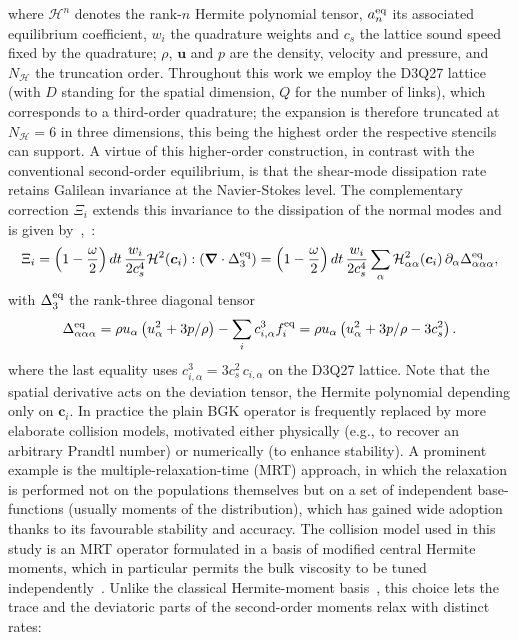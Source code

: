 where $\mathcal{H}^n$ denotes the rank-$n$ Hermite polynomial tensor, $a_n^{\rm eq}$ its associated equilibrium coefficient, $w_i$ the quadrature weights and $c_s$ the lattice sound speed fixed by the quadrature; $\rho$, $\bm{u}$ and $p$ are the density, velocity and pressure, and $N_\mathcal{H}$ the truncation order. Throughout this work we employ the D3Q27 lattice (with $D$ standing for the spatial dimension, $Q$ for the number of links), which corresponds to a third-order quadrature; the expansion is therefore truncated at $N_\mathcal{H}=6$ in three dimensions, this being the highest order the respective stencils can support. A virtue of this higher-order construction, in contrast with the conventional second-order equilibrium, is that the shear-mode dissipation rate retains Galilean invariance at the Navier-Stokes level. The complementary correction $\Xi_i$ extends this invariance to the dissipation of the normal modes and is given by~\cite{hosseini2020compressibility,feng2015three},~\cite{hosseini2022consistent,hosseini2024combustion}:
\begin{equation}\label{eq:correction}
    \Xi_i = \left(1-\frac{\omega}{2}\right)dt\,\frac{w_i}{2c_s^4}\mathcal{H}^2(\bm{c}_i):\left(\bm{\nabla}\cdot\Delta^{\rm eq}_3\right)
    = \left(1-\frac{\omega}{2}\right)dt\,\frac{w_i}{2c_s^4}\sum_{\alpha}\mathcal{H}^2_{\alpha\alpha}(\bm{c}_i)\,\partial_\alpha\Delta^{\rm eq}_{\alpha\alpha\alpha},
\end{equation}
with $\Delta^{\rm eq}_3$ the rank-three diagonal tensor
\begin{equation}
    \Delta^{\rm eq}_{\alpha\alpha\alpha} = \rho u_\alpha \left(u_\alpha^2 + 3p/\rho\right) - \sum_i c_{i,\alpha}^3 f^{\rm eq}_i = \rho u_\alpha \left(u_\alpha^2 + 3p/\rho - 3c_s^2\right).
\end{equation}
where the last equality uses $c_{i,\alpha}^3 = 3c_s^2\,c_{i,\alpha}$ on the D3Q27 lattice. Note that the spatial derivative acts on the deviation tensor, the Hermite polynomial depending only on $\bm{c}_i$.
In practice the plain BGK operator is frequently replaced by more elaborate collision models, motivated either physically (e.g., to recover an arbitrary Prandtl number) or numerically (to enhance stability). A prominent example is the multiple-relaxation-time (MRT) approach, in which the relaxation is performed not on the populations themselves but on a set of independent base-functions (usually moments of the distribution), which has gained wide adoption thanks to its favourable stability and accuracy. The collision model used in this study is an MRT operator formulated in a basis of modified central Hermite moments, which in particular permits the bulk viscosity to be tuned independently~\cite{hosseini2022lattice}. Unlike the classical Hermite-moment basis~\cite{hosseini2021central,huang2022simulation}, this choice lets the trace and the deviatoric parts of the second-order moments relax with distinct rates:
